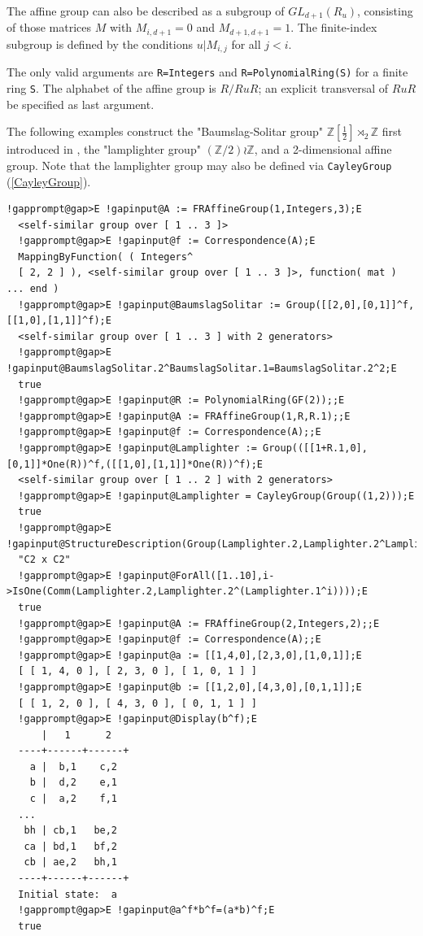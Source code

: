 \documentclass[a4paper,11pt]{report}
\begin{document}
{{{ The affine group can also be described as a subgroup of $GL_{d+1}(R_u)$, consisting of those matrices $M$ with $M_{i,d+1}=0$ and $M_{d+1,d+1}=1$. The finite-index subgroup is defined by the conditions $u|M_{i,j}$ for all $j<i$. 

 The only valid arguments are \texttt{R=Integers} and \texttt{R=PolynomialRing(S)} for a finite ring \texttt{S}. The alphabet of the affine group is $R/RuR$; an explicit transversal of $RuR$ be specified as last argument. 

 The following examples construct the "Baumslag-Solitar group" $\mathbb Z[\frac12]\rtimes_2\mathbb Z$ first introduced in \cite{MR0142635}, the "lamplighter group" $(\mathbb Z/2)\wr\mathbb Z$, and a 2-dimensional affine group. Note that the lamplighter group may also
be defined via \texttt{CayleyGroup} (\ref{CayleyGroup}). 
\begin{Verbatim}[commandchars=!@E,fontsize=\small,frame=single,label=Example]
  !gapprompt@gap>E !gapinput@A := FRAffineGroup(1,Integers,3);E
  <self-similar group over [ 1 .. 3 ]>
  !gapprompt@gap>E !gapinput@f := Correspondence(A);E
  MappingByFunction( ( Integers^
  [ 2, 2 ] ), <self-similar group over [ 1 .. 3 ]>, function( mat ) ... end )
  !gapprompt@gap>E !gapinput@BaumslagSolitar := Group([[2,0],[0,1]]^f,[[1,0],[1,1]]^f);E
  <self-similar group over [ 1 .. 3 ] with 2 generators>
  !gapprompt@gap>E !gapinput@BaumslagSolitar.2^BaumslagSolitar.1=BaumslagSolitar.2^2;E
  true
  !gapprompt@gap>E !gapinput@R := PolynomialRing(GF(2));;E
  !gapprompt@gap>E !gapinput@A := FRAffineGroup(1,R,R.1);;E
  !gapprompt@gap>E !gapinput@f := Correspondence(A);;E
  !gapprompt@gap>E !gapinput@Lamplighter := Group(([[1+R.1,0],[0,1]]*One(R))^f,([[1,0],[1,1]]*One(R))^f);E
  <self-similar group over [ 1 .. 2 ] with 2 generators>
  !gapprompt@gap>E !gapinput@Lamplighter = CayleyGroup(Group((1,2)));E
  true
  !gapprompt@gap>E !gapinput@StructureDescription(Group(Lamplighter.2,Lamplighter.2^Lamplighter.1));E
  "C2 x C2"
  !gapprompt@gap>E !gapinput@ForAll([1..10],i->IsOne(Comm(Lamplighter.2,Lamplighter.2^(Lamplighter.1^i))));E
  true
  !gapprompt@gap>E !gapinput@A := FRAffineGroup(2,Integers,2);;E
  !gapprompt@gap>E !gapinput@f := Correspondence(A);;E
  !gapprompt@gap>E !gapinput@a := [[1,4,0],[2,3,0],[1,0,1]];E
  [ [ 1, 4, 0 ], [ 2, 3, 0 ], [ 1, 0, 1 ] ]
  !gapprompt@gap>E !gapinput@b := [[1,2,0],[4,3,0],[0,1,1]];E
  [ [ 1, 2, 0 ], [ 4, 3, 0 ], [ 0, 1, 1 ] ]
  !gapprompt@gap>E !gapinput@Display(b^f);E
      |   1      2
  ----+------+------+
    a |  b,1    c,2
    b |  d,2    e,1
    c |  a,2    f,1
  ...
   bh | cb,1   be,2
   ca | bd,1   bf,2
   cb | ae,2   bh,1
  ----+------+------+
  Initial state:  a
  !gapprompt@gap>E !gapinput@a^f*b^f=(a*b)^f;E
  true
\end{Verbatim}
 }

}}
\end{document}
